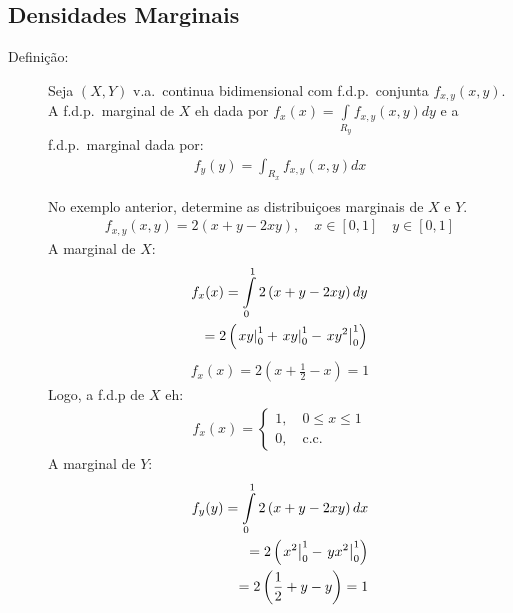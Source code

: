 \subsection{Densidades Marginais}
\begin{description}
  \item [Definição:] Seja $(X,Y)$ v.a.\ continua bidimensional com f.d.p.\ conjunta $f_{x,y}(x,y)$. A f.d.p.\ marginal de $X$ eh dada por $f_{x}(x)= \int \limits_{R_{y}}f_{x,y}(x,y)dy$ e a f.d.p.\ marginal dada por:
    \begin{align*}
      f_{y} (y)= \int_{R_{x}}f_{x,y} (x,y) dx
    \end{align*}
    \begin{example}
      No exemplo anterior, determine as distribuiçoes marginais de $X$ e $Y$. 
      \begin{align*}
        f_{x,y} (x,y) = 2(x+y -2xy), \quad x \in \left[ 0,1 \right] \quad y \in \left[ 0,1 \right]
      \end{align*}
      A marginal de $X$:
      \begin{align*}
        f_{x} (x)= \int \limits_{0}^{1} 2 \left(x+y -2xy \right) dy \\ 
        = 2 \left( \left.xy\right\rvert_{0}^{1} + \left.xy\right\rvert_{0}^{1} - \left.xy^2\right\rvert_{0}^{1} \right)
      \end{align*}
      \begin{align*}
        f_{x}(x)= 2 \left( x + \frac{1}{2} - x \right)= 1
      \end{align*}
      Logo, a f.d.p de $X$ eh:
      \begin{align*}
        f_{x} (x) = \begin{cases}
          1, \quad 0 \leq x \leq 1  \\
          0, \quad \text{c.c.}
        \end{cases}
      \end{align*}
      A marginal de $Y$:
      \begin{align*}
        f_{y} (y) = \int \limits_{0}^{1} 2 \left(x+y -2xy\right)dx \\
        =2 \left( \left.x^2\right\rvert_{0}^{1}- \left.yx^2\right\rvert_{0}^{1}\right)\\
        = 2 \left(\frac{1}{2}+ y - y\right)=1
      \end{align*}
  \end{example}
  \end{description}
